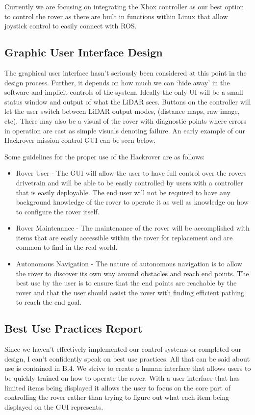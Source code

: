 \documentclass[a4paper, 10pt]{article}
\begin{document}
Currently we are focusing on integrating the Xbox controller as our best option to control the rover as there are built in functions within Linux that allow joystick control to easily connect with ROS. 


	\subsection{Graphic User Interface Design}
	The graphical user interface hasn’t seriously been considered at this point in the design process. Further, it depends on how much we can ‘hide away’ in the software and implicit controls of the system. Ideally the only UI will be a small status window and output of what the LiDAR sees. Buttons on the controller will let the user switch between LiDAR output modes, (distance maps, raw image, etc). There may also be a visual of the rover with diagnostic points where errors in operation are cast as simple visuals denoting failure. An early example of our Hackrover mission control GUI can be seen below.
	
Some guidelines for the proper use of the Hackrover are as follows:

\begin{itemize}
\item
Rover User - The GUI will allow the user to have full control over the rovers drivetrain and will be able to be easily controlled by users with a controller that is easily deployable. The end user will not be required to have any background knowledge of the rover to operate it as well as knowledge on how to configure the rover itself.

\item
Rover Maintenance - The maintenance of the rover will be accomplished with items that are easily accessible within the rover for replacement and are common to find in the real world.

\item
Autonomous Navigation - The nature of autonomous navigation is to allow the rover to discover its own way around obstacles and reach end points. The best use by the user is to ensure that the end points are reachable by the rover and that the user should assist the rover with finding efficient pathing to reach the end goal. 
\end{itemize}

	\subsection{Best Use Practices Report}
	Since we haven't effectively implemented our control systems or completed our design, I can't confidently speak on best use practices. All that can be said about use is contained in B.4. We strive to create a human interface that allows users to be quickly trained on how to operate the rover. With a user interface that has limited items being displayed it allows the user to focus on the core part of controlling the rover rather than trying to figure out what each item being displayed on the GUI represents. 
	
\end{document}
